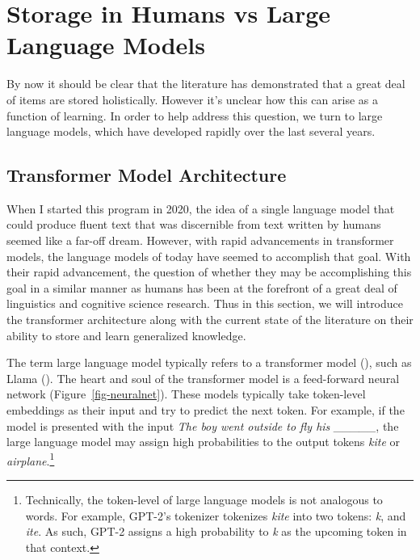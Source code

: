 \documentclass[
  12pt,
  letterpaper,
]{scrreprt}
\begin{document}
\section{Storage in Humans vs Large Language
Models}\label{sec-storage-in-humans-vs-large-language-models}

By now it should be clear that the literature has demonstrated that a
great deal of items are stored holistically. However it's unclear how
this can arise as a function of learning. In order to help address this
question, we turn to large language models, which have developed rapidly
over the last several years.

\subsection{Transformer Model
Architecture}\label{transformer-model-architecture}

When I started this program in 2020, the idea of a single language model
that could produce fluent text that was discernible from text written by
humans seemed like a far-off dream. However, with rapid advancements in
transformer models, the language models of today have seemed to
accomplish that goal. With their rapid advancement, the question of
whether they may be accomplishing this goal in a similar manner as
humans has been at the forefront of a great deal of linguistics and
cognitive science research. Thus in this section, we will introduce the
transformer architecture along with the current state of the literature
on their ability to store and learn generalized knowledge.

The term large language model typically refers to a transformer model
(), such
as Llama ().
The heart and soul of the transformer model is a feed-forward neural
network (Figure~\ref{fig-neuralnet}). These models typically take
token-level embeddings as their input and try to predict the next token.
For example, if the model is presented with the input \emph{The boy went
outside to fly his \_\_\_\_\_}, the large language model may assign high
probabilities to the output tokens \emph{kite} or
\emph{airplane}.\footnote{Technically, the token-level of large language
  models is not analogous to words. For example, GPT-2's tokenizer
  tokenizes \emph{kite} into two tokens: \emph{k}, and \emph{ite}. As
  such, GPT-2 assigns a high probability to \emph{k} as the upcoming
  token in that context.}
\end{document}
